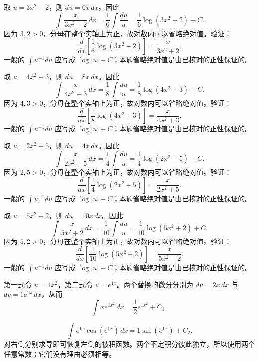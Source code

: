 \documentclass[UTF8,12pt,a4paper,fontset=fandol]{ctexart}
\begin{document}
\begin{solve}\label{ans:c12q9}
取 $u=3x^2+2$，则 $du=6x\,dx$。因此
\[
\int\frac{x}{3x^2+2}\,dx=\frac{1}{6}\int\frac{du}u=\frac{1}{6}\log(3x^2+2)+C.
\]
因为 $3,2>0$，分母在整个实轴上为正，故对数内可以省略绝对值。验证：
\[
\frac d{dx}\left[\frac{1}{6}\log(3x^2+2)\right]=\frac{x}{3x^2+2}.
\]
一般的 $\int u^{-1}du$ 应写成 $\log|u|+C$；本题省略绝对值是由已核对的正性保证的。
\end{solve}

\begin{solve}\label{ans:c12q10}
取 $u=4x^2+3$，则 $du=8x\,dx$。因此
\[
\int\frac{x}{4x^2+3}\,dx=\frac{1}{8}\int\frac{du}u=\frac{1}{8}\log(4x^2+3)+C.
\]
因为 $4,3>0$，分母在整个实轴上为正，故对数内可以省略绝对值。验证：
\[
\frac d{dx}\left[\frac{1}{8}\log(4x^2+3)\right]=\frac{x}{4x^2+3}.
\]
一般的 $\int u^{-1}du$ 应写成 $\log|u|+C$；本题省略绝对值是由已核对的正性保证的。
\end{solve}

\begin{solve}\label{ans:c12q11}
取 $u=2x^2+5$，则 $du=4x\,dx$。因此
\[
\int\frac{x}{2x^2+5}\,dx=\frac{1}{4}\int\frac{du}u=\frac{1}{4}\log(2x^2+5)+C.
\]
因为 $2,5>0$，分母在整个实轴上为正，故对数内可以省略绝对值。验证：
\[
\frac d{dx}\left[\frac{1}{4}\log(2x^2+5)\right]=\frac{x}{2x^2+5}.
\]
一般的 $\int u^{-1}du$ 应写成 $\log|u|+C$；本题省略绝对值是由已核对的正性保证的。
\end{solve}

\begin{solve}\label{ans:c12q12}
取 $u=5x^2+2$，则 $du=10x\,dx$。因此
\[
\int\frac{x}{5x^2+2}\,dx=\frac{1}{10}\int\frac{du}u=\frac{1}{10}\log(5x^2+2)+C.
\]
因为 $5,2>0$，分母在整个实轴上为正，故对数内可以省略绝对值。验证：
\[
\frac d{dx}\left[\frac{1}{10}\log(5x^2+2)\right]=\frac{x}{5x^2+2}.
\]
一般的 $\int u^{-1}du$ 应写成 $\log|u|+C$；本题省略绝对值是由已核对的正性保证的。
\end{solve}

\begin{solve}\label{ans:c12q13}
第一式令 $u=1x^2$，第二式令 $v=e^{1x}$。两个替换的微分分别为 $du=2x\,dx$ 与 $dv=1e^{1x}\,dx$，从而
\[
\int xe^{1x^2}\,dx=\frac{1}{2}e^{1x^2}+C_1,
\]

\[
\int e^{1x}\cos(e^{1x})\,dx=1\sin(e^{1x})+C_2.
\]
对右侧分别求导即可恢复左侧的被积函数。两个不定积分彼此独立，所以使用两个任意常数；它们没有理由必须相等。
\end{solve}
\end{document}
